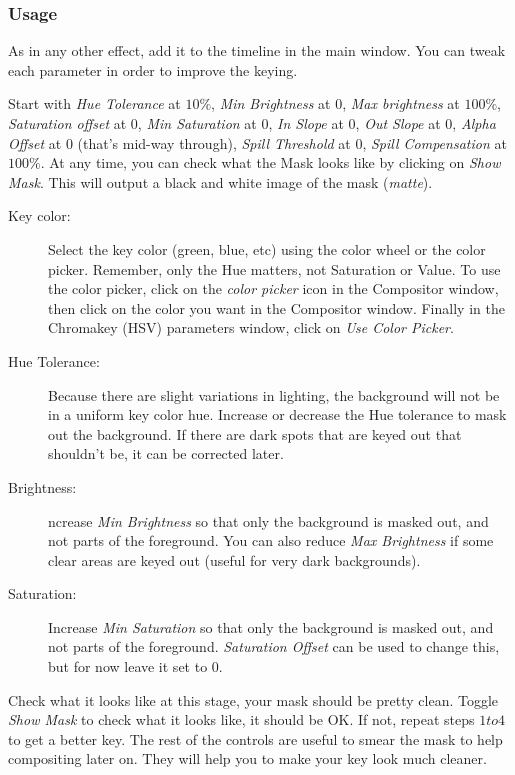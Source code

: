 \subsubsection*{Usage}
\label{ssub:usage}

As in any other effect, add it to the timeline in the main window. You can tweak each parameter in order to improve the keying.

Start with \textit{Hue Tolerance} at $10\%$, \textit{Min Bright\-ness} at $0$, \textit{Max bright\-ness} at $100\%$, \textit{Saturation offset} at $0$, \textit{Min Saturation} at $0$, \textit{In Slope} at $0$, \textit{Out Slope} at $0$, \textit{Alpha Offset} at $0$ (that’s mid-way through), \textit{Spill Threshold} at $0$, \textit{Spill Compensation} at $100\%$. At any time, you can check what the Mask looks like by clicking on \textit{Show Mask}. This will output a black and white image of the mask (\textit{matte}).

\begin{description}
    \item[Key color:] Select the key color (green, blue, etc) using the color wheel or the color picker. Remember, only the Hue matters, not Saturation or Value. To use the color picker, click on the \textit{color picker} icon in the Compositor window, then click on the color you want in the Compositor window. Finally  in the Chromakey (HSV) parameters window, click on \textit{Use Color Picker}.
    \item[Hue Tolerance:] Because there are slight variations in lighting, the background will not be in a uniform key color hue. Increase or decrease the Hue tolerance to mask out the background. If there are dark spots that are keyed out that shouldn’t be, it can be corrected later.
    \item[Brightness:] ncrease \textit{Min Brightness} so that only the background is masked out, and not parts of the foreground. You can also reduce \textit{Max Brightness} if some clear areas are keyed out (useful for very dark backgrounds).
    \item[Saturation:] Increase \textit{Min Saturation} so that only the background is masked out, and not parts of the foreground. \textit{Saturation Offset} can be used to change this, but for now leave it set to $0$.
\end{description}

Check what it looks like at this stage, your mask should be pretty
clean. Toggle \textit{Show Mask} to check what it looks like, it
should be OK\@. If not, repeat steps $1 to 4$ to get a better
key. The rest of the controls are useful to smear the mask to help
compositing later on. They will help you to make your key look much
cleaner.

